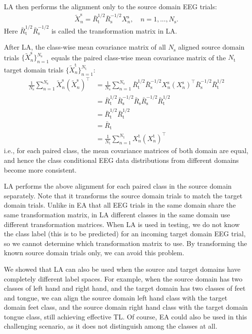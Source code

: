 \documentclass[journal]{IEEEtran}
\begin{document}
LA then performs the alignment only to the source domain EEG trials:
\begin{align}
  \tilde{X}_n^\mathrm{s}=\bar{R}_\mathrm{t}^{1/2}\bar{R}_\mathrm{s}^{-1/2}X_n^\mathrm{s},\quad n=1,...,N_\mathrm{s}.
\end{align}
Here $\bar{R}_\mathrm{t}^{1/2}\bar{R}_\mathrm{s}^{-1/2}$ is called the transformation matrix in LA.

After LA, the class-wise mean covariance matrix of all $N_\mathrm{s}$ aligned source domain trials $\{\tilde{X}_n^\mathrm{s}\}_{n=1}^{N_\mathrm{s}}$ equals the paired class-wise mean covariance matrix of the $N_\mathrm{t}$ target domain trials $\{\tilde{X}_n^\mathrm{t}\}_{n=1}^{N_\mathrm{t}}$:
\begin{align}
\frac{1}{N_\mathrm{s}}\sum_{n=1}^{N_\mathrm{s}}\tilde{X}_n^\mathrm{s}(\tilde{X}_n^\mathrm{s})^\top  &=\frac{1}{N_\mathrm{s}}\sum_{n=1}^{N_\mathrm{s}}\bar{R}_\mathrm{t}^{1/2} \bar{R}_\mathrm{s}^{-1/2} X_n^\mathrm{s}
(X_n^\mathrm{s})^\top\bar{R}_\mathrm{s}^{-1/2}\bar{R}_\mathrm{t}^{1/2}\nonumber \\
&=\bar{R}_\mathrm{t}^{1/2}\bar{R}_\mathrm{s}^{-1/2} \bar{R}_\mathrm{s} \bar{R}_\mathrm{s}^{-1/2}\bar{R}_\mathrm{t}^{1/2}\nonumber\\
&=\bar{R}_\mathrm{t}^{1/2} \bar{R}_\mathrm{t}^{1/2}\nonumber\\
&=\bar{R}_\mathrm{t}\nonumber\\
&=\frac{1}{N_\mathrm{t}}\sum_{n=1}^{N_\mathrm{t}}X_n^\mathrm{t}(X_n^\mathrm{t})^\top
\end{align}
i.e., for each paired class, the mean covariance matrices of both domain are equal, and hence the class conditional EEG data distributions from different domains become more consistent.

LA performs the above alignment for each paired class in the source domain separately. Note that it transforms the source domain trials to match the target domain trials. Unlike in EA that all EEG trials in the same domain share the same transformation matrix, in LA different classes in the same domain use different transformation matrices. When LA is used in testing, we do not know the class label (this is to be predicted) for an incoming target domain EEG trial, so we cannot determine which transformation matrix to use. By transforming the known source domain trials only, we can avoid this problem.

We \cite{drwuLA2020} showed that LA can also be used when the source and target domains have completely different label spaces. For example, when the source domain has two classes of left hand and right hand, and the target domain has two classes of feet and tongue, we can align the source domain left hand class with the target domain feet class, and the source domain right hand class with the target domain tongue class, still achieving effective TL. Of course, EA could also be used in this challenging scenario, as it does not distinguish among the classes at all.
\end{document}
